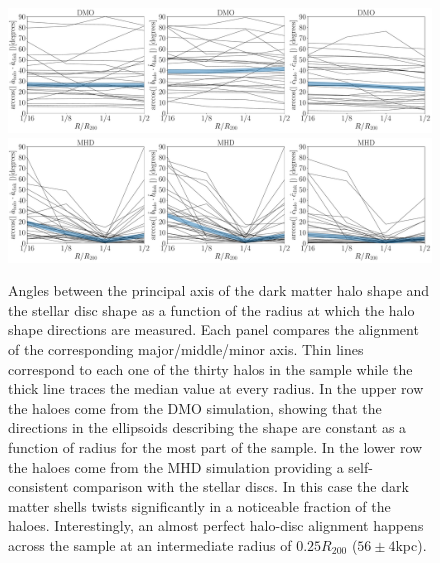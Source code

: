 \documentclass[usenatbib]{mnras}
\begin{document}
\begin{figure}
\begin{center}
\includegraphics[width=1.0\textwidth]{angles_alignment_DM.pdf}
\includegraphics[width=1.0\textwidth]{angles_alignment_MHD.pdf}
\end{center}
\caption{Angles between the principal axis of the dark matter halo
  shape and the stellar disc shape as a function of the radius at
  which the halo shape directions are measured.
  Each panel compares the alignment of the corresponding
  major/middle/minor axis.
  Thin lines correspond to each one of the thirty halos in the sample
  while the thick line traces the median value at every radius.
  In the upper row the haloes come from the DMO simulation, 
  showing that the directions in the ellipsoids describing the shape
  are constant as a function of radius for the most part of the sample.
  In the lower row the haloes come from the MHD simulation providing a 
  self-consistent comparison with the stellar discs. 
  In this case the dark matter shells twists significantly in a
  noticeable fraction of the haloes.
  Interestingly, an almost perfect halo-disc alignment happens across
  the sample at an intermediate radius of $0.25R_{200}$ ($56\pm
  4$kpc). 
}
\label{fig:cumulative_alignment}
\end{figure}
\end{document}
